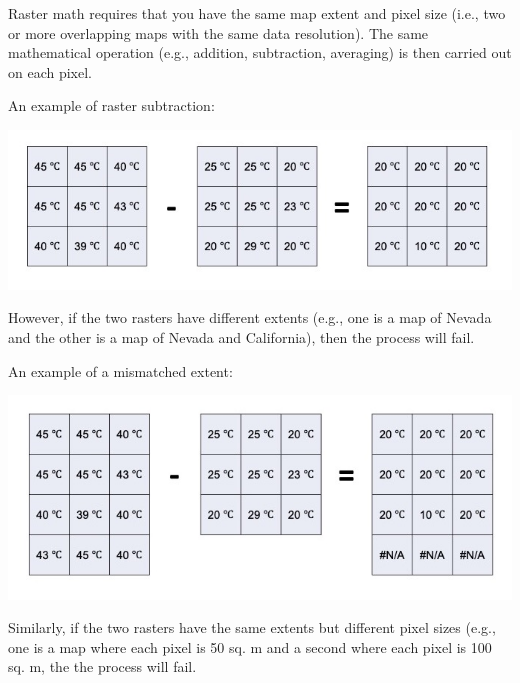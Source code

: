 \documentclass[oneside,a4paper,11pt,explicit]{book}
\begin{document}
\begin{tcolorbox}[enhanced jigsaw,breakable,pad at break*=1mm,
  colback=yellow!5!white,colframe=IceCreamLeaf,title=An Introduction to Raster Math]

    Raster math requires that you have the same map extent and pixel size (i.e., two or more overlapping maps with the same data resolution). The same mathematical operation (e.g., addition, subtraction, averaging) is then carried out on each pixel. 

    An example of raster subtraction:
 
    \vspace{.5em}

    \centerline{\includegraphics[width=\textwidth]{RasterMathExample.png}}

    \vspace{.5em}

However, if the two rasters have different extents (e.g., one is a map of Nevada and the other is a map of Nevada and California), then the process will fail. 

   An example of a mismatched extent:
   
    \vspace{.5em}

    \centerline{\includegraphics[width=\textwidth]{RasterMath-MismatchedExtent.png}}

    \vspace{.5em}
     
    Similarly, if the two rasters have the same extents but different pixel sizes (e.g., one is a map where each pixel is 50 sq. m and a second where each pixel is 100 sq. m, the the process will fail. 


\end{tcolorbox}
\end{document}
